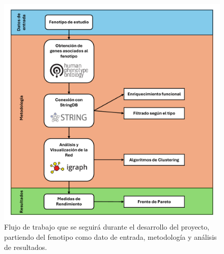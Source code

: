 \begin{figure}[h]
	\centering
	\includegraphics[width=1\linewidth]{figures/methods/Flujo_de_trabajo.pdf}
	\caption{Flujo de trabajo que se seguirá durante el desarrollo del proyecto, partiendo del fenotipo como dato de entrada, metodología y análisis de resultados.}
	\label{fig:flujo_trabajo}
\end{figure}
